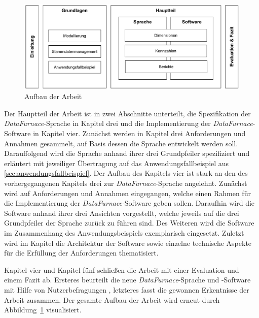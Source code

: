 \documentclass[
  language=german, %
  type=bachelor,%
  ngerman
]{isthesis}
\begin{document}
\begin{content}
  \begin{figure}
    \includegraphics[scale=0.60]{content/figures/thesis-structure}
    \caption{Aufbau der Arbeit}\label{fig:thesis-structure}
  \end{figure}

  Der Hauptteil der Arbeit ist in zwei Abschnitte unterteilt, die Spezifikation
  der \textit{DataFurnace}-Sprache in Kapitel drei und die Implementierung der
  \textit{DataFurnace}-Software in Kapitel vier. Zunächst werden in Kapitel
  drei Anforderungen und Annahmen gesammelt, auf Basis dessen die Sprache
  entwickelt werden soll. Darauffolgend wird die Sprache anhand ihrer drei
  Grundpfeiler spezifiziert und erläutert mit jeweiliger Übertragung auf das
  Anwendungsfallbeispiel aus \cref{sec:anwendungsfallbeispiel}.  Der Aufbau des
  Kapitels vier ist stark an den des vorhergegangenen Kapitels drei zur
  \textit{DataFurnace}-Sprache angelehnt. Zunächst wird auf Anforderungen und
  Annahmen eingegangen, welche einen Rahmen für die Implementierung der
  \textit{DataFurnace}-Software geben sollen. Daraufhin wird die Software
  anhand ihrer drei Ansichten vorgestellt, welche jeweils auf die drei
  Grundpfeiler der Sprache zurück zu führen sind. Des Weiteren wird die
  Software im Zusammenhang des Anwendungsbeispiels exemplarisch eingesetzt.
  Zuletzt wird im Kapitel die Architektur der Software sowie einzelne
  technische Aspekte für die Erfüllung der Anforderungen thematisiert.

  Kapitel vier und Kapitel fünf schließen die Arbeit mit einer Evaluation und
  einem Fazit ab. Ersteres beurteilt die neue \textit{DataFurnace}-Sprache und
  -Software mit Hilfe von Nutzerbefragungen , letzteres
  fasst die gewonnen Erkentnisse der Arbeit zusammen.  Der gesamte Aufbau der
  Arbeit wird erneut durch Abbildung~\ref{fig:thesis-structure} visualisiert.




\end{content}
\end{document}

